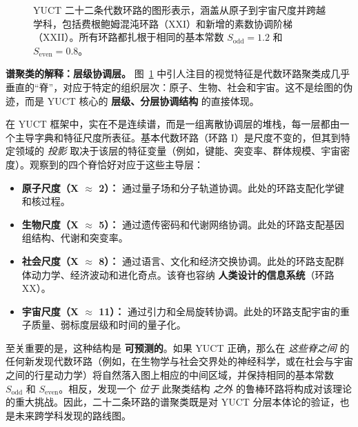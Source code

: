 \documentclass[12pt,a4paper]{article}
\begin{document}
\begin{figure}[htbp]
		\caption{YUCT 二十二条代数环路的图形表示，涵盖从原子到宇宙尺度并跨越学科，包括费根鲍姆混沌环路（XXI）和新增的素数协调阶梯（XXII）。所有环路都扎根于相同的基本常数 $S_{\mathrm{odd}} = 1.2$ 和 $S_{\mathrm{even}} = 0.8$。}
		\label{fig:twentyone-loops}
	\end{figure}
	
	\vspace{0.5cm}
	\noindent
	\textbf{谱聚类的解释：层级协调层。}
	图~\ref{fig:twentyone-loops} 中引人注目的视觉特征是代数环路聚类成几乎垂直的“脊”，对应于特定的组织层次：原子、生物、社会和宇宙。这不是绘图的伪迹，而是 YUCT 核心的 \textbf{层级、分层协调结构} 的直接体现。
	
	在 YUCT 框架中，实在不是连续谱，而是一组离散协调层的堆栈，每一层都由一个主导字典和特征尺度所表征。基本代数环路（环路 I）是尺度不变的，但其到特定领域的 \textit{投影} 取决于该层的特征变量（例如，键能、突变率、群体规模、宇宙密度）。观察到的四个脊恰好对应于这些主导层：
	\begin{itemize}
		\item \textbf{原子尺度（X $\approx$ 2）：} 通过量子场和分子轨道协调。此处的环路支配化学键和核过程。
		\item \textbf{生物尺度（X $\approx$ 5）：} 通过遗传密码和代谢网络协调。此处的环路支配基因组结构、代谢和突变率。
		\item \textbf{社会尺度（X $\approx$ 8）：} 通过语言、文化和经济交换协调。此处的环路支配群体动力学、经济波动和进化奇点。该脊也容纳 \textbf{人类设计的信息系统}（环路 XX）。
		\item \textbf{宇宙尺度（X $\approx$ 11）：} 通过引力和全局旋转协调。此处的环路支配宇宙的重子质量、弱标度层级和时间的量子化。
	\end{itemize}
	
	至关重要的是，这种结构是 \textbf{可预测的}。如果 YUCT 正确，那么在 \textit{这些脊之间} 的任何新发现代数环路（例如，在生物学与社会交界处的神经科学，或在社会与宇宙之间的行星动力学）将自然落入图上相应的中间区域，并保持相同的基本常数 \(S_{\mathrm{odd}}\) 和 \(S_{\mathrm{even}}\)。相反，发现一个 \textit{位于} 此聚类结构 \textit{之外} 的鲁棒环路将构成对该理论的重大挑战。因此，二十二条环路的谱聚类既是对 YUCT 分层本体论的验证，也是未来跨学科发现的路线图。
	
\end{document}
